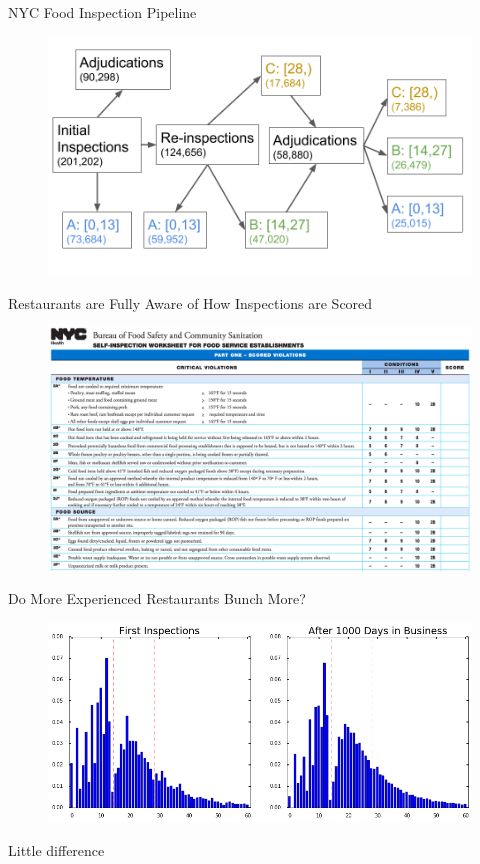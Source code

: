 \documentclass[handout]{beamer}
\begin{document}
\begin{frame}{NYC Food Inspection Pipeline}
\begin{figure}
    \centering
    \includegraphics[scale = 0.3]{../../Figures/Scores.png}
\end{figure}
\end{frame}
\iffalse
\begin{frame}{Restaurants are Fully Aware of How Inspections are Scored}
\begin{figure}
    \centering
    \includegraphics[trim={0 0 0 3cm},clip,scale = 0.28]{self_assessment.png}
\end{figure}
\end{frame}
\begin{frame}{Do More Experienced Restaurants Bunch More?}
\begin{figure}
    \centering
    \includegraphics[scale = 0.4]{new_experienced.png}
\end{figure}
Little difference
\end{frame}
\end{document}
